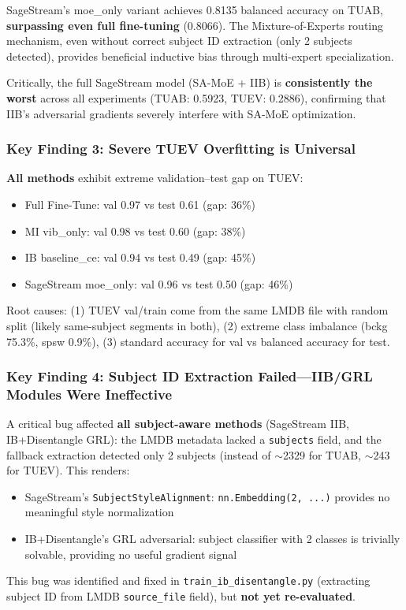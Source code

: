 \documentclass{article}
\begin{document}
SageStream's moe\_only variant achieves 0.8135 balanced accuracy on TUAB, \textbf{surpassing even full fine-tuning} (0.8066). The Mixture-of-Experts routing mechanism, even without correct subject ID extraction (only 2 subjects detected), provides beneficial inductive bias through multi-expert specialization.

Critically, the full SageStream model (SA-MoE + IIB) is \textbf{consistently the worst} across all experiments (TUAB: 0.5923, TUEV: 0.2886), confirming that IIB's adversarial gradients severely interfere with SA-MoE optimization.

\subsubsection{Key Finding 3: Severe TUEV Overfitting is Universal}

\textbf{All methods} exhibit extreme validation--test gap on TUEV:
\begin{itemize}
\item Full Fine-Tune: val 0.97 vs test 0.61 (gap: 36\%)
\item MI vib\_only: val 0.98 vs test 0.60 (gap: 38\%)
\item IB baseline\_ce: val 0.94 vs test 0.49 (gap: 45\%)
\item SageStream moe\_only: val 0.96 vs test 0.50 (gap: 46\%)
\end{itemize}

Root causes: (1) TUEV val/train come from the same LMDB file with random split (likely same-subject segments in both), (2) extreme class imbalance (bckg 75.3\%, spsw 0.9\%), (3) standard accuracy for val vs balanced accuracy for test.

\subsubsection{Key Finding 4: Subject ID Extraction Failed---IIB/GRL Modules Were Ineffective}

A critical bug affected \textbf{all subject-aware methods} (SageStream IIB, IB+Disentangle GRL): the LMDB metadata lacked a \texttt{subjects} field, and the fallback extraction detected only 2 subjects (instead of $\sim$2329 for TUAB, $\sim$243 for TUEV). This renders:
\begin{itemize}
\item SageStream's \texttt{SubjectStyleAlignment}: \texttt{nn.Embedding(2, ...)} provides no meaningful style normalization
\item IB+Disentangle's GRL adversarial: subject classifier with 2 classes is trivially solvable, providing no useful gradient signal
\end{itemize}
This bug was identified and fixed in \texttt{train\_ib\_disentangle.py} (extracting subject ID from LMDB \texttt{source\_file} field), but \textbf{not yet re-evaluated}.
\end{document}
